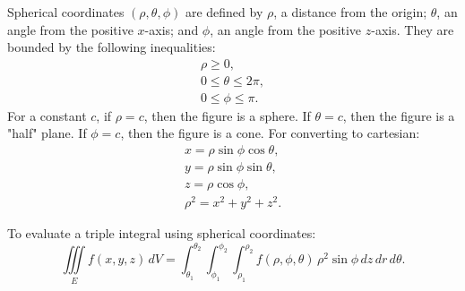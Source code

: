 \documentclass{article}
\begin{document}
Spherical coordinates $(\rho, \theta, \phi)$ are defined by $\rho$, a distance from the origin;
$\theta$, an angle from the positive $x$-axis; and $\phi$, an angle from the
positive $z$-axis. They are bounded by the following inequalities:
\begin{gather}
    \rho \ge 0 \nonumber, \\
    0 \le \theta \le 2\pi \nonumber, \\
    0 \le \phi \le \pi \nonumber.
\end{gather} 
For a constant $c$, if $\rho = c$, then the figure is a sphere. If $\theta = c$,
then the figure is a "half" plane. If $\phi = c$, then the figure is a cone.
For converting to cartesian:
\begin{gather}
    x = \rho \sin\phi \cos\theta \nonumber, \\
    y = \rho \sin\phi \sin\theta \nonumber, \\
    z = \rho \cos\phi \nonumber, \\
    \rho^2 = x^2 + y^2 + z^2 \nonumber.
\end{gather}

To evaluate a triple integral using spherical coordinates:
\[
    \iiint \limits_E f(x,y,z) \, dV = \int_{\theta_1}^{\theta_2} \int_{\phi_1}^{\phi_2} \int_{\rho_1}^{\rho_2} f(\rho,\phi,\theta) \, \rho^2\sin\phi \, dz \, dr \, d\theta.
\]
\end{document}
